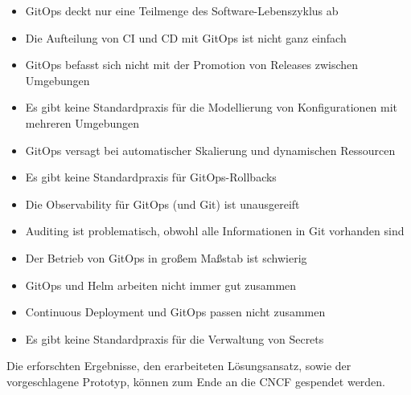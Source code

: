 \begin{itemize}
	\item GitOps deckt nur eine Teilmenge des Software-Lebenszyklus ab
	\item Die Aufteilung von CI und CD mit GitOps ist nicht ganz einfach
	\item GitOps befasst sich nicht mit der Promotion von Releases zwischen Umgebungen
	\item Es gibt keine Standardpraxis für die Modellierung von Konfigurationen mit mehreren Umgebungen
	\item GitOps versagt bei automatischer Skalierung und dynamischen Ressourcen
	\item Es gibt keine Standardpraxis für GitOps-Rollbacks
	\item Die Observability für GitOps (und Git) ist unausgereift
	\item Auditing ist problematisch, obwohl alle Informationen in Git vorhanden sind
	\item Der Betrieb von GitOps in großem Maßstab ist schwierig
	\item GitOps und Helm arbeiten nicht immer gut zusammen
	\item Continuous Deployment und GitOps passen nicht zusammen
	\item Es gibt keine Standardpraxis für die Verwaltung von Secrets
\end{itemize}

\autocite{codefreshGitopsPains10}
\bigskip




\noindent
Die erforschten Ergebnisse,
den erarbeiteten Lösungsansatz,
sowie der vorgeschlagene Prototyp,
können zum Ende
an die CNCF gespendet werden.

